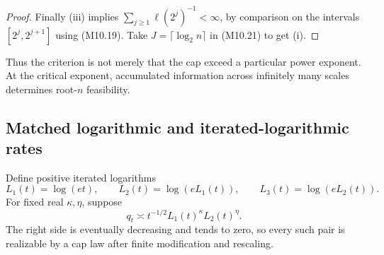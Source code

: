 \documentclass[11pt,a4paper]{article}
\theoremstyle{definition}\newtheorem{definition}[theorem]{Definition}
\theoremstyle{remark}\newtheorem{remark}[theorem]{Remark}
\numberwithin{equation}{section}
\begin{document}
\begin{proof}
Finally (iii) implies $\sum_{j\ge1}\ell(2^j)^{-1}<\infty$, by comparison on the intervals $[2^j,2^{j+1}]$ using (M10.19). Take $J=\lceil\log_2n\rceil$ in (M10.21) to get (i).
\end{proof}
Thus the criterion is not merely that the cap exceed a particular power exponent. At the critical exponent, accumulated information across infinitely many scales determines root-$n$ feasibility.

\subsection{Matched logarithmic and iterated-logarithmic rates}\label{M10-sec-6}
Define positive iterated logarithms
\[
 L_1(t)=\log(et),\qquad L_2(t)=\log(eL_1(t)),\qquad
 L_3(t)=\log(eL_2(t)).
\]
For fixed real $\kappa,\eta$, suppose
\[
 q_t\asymp t^{-1/2}L_1(t)^\kappa L_2(t)^\eta.\tag{M10.24}
\]
The right side is eventually decreasing and tends to zero, so every such pair is realizable by a cap law after finite modification and rescaling.
\end{document}
